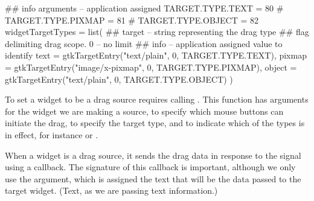 \begin{Schunk}
\begin{Sinput}
 ## info arguments -- application assigned
 TARGET.TYPE.TEXT   = 80                 # 
 TARGET.TYPE.PIXMAP = 81                 # 
 TARGET.TYPE.OBJECT = 82
 widgetTargetTypes = list(
 ## target -- string representing the drag type
 ## flag delimiting drag scope. 0 -- no limit
 ## info -- application assigned value to identify
 text = gtkTargetEntry("text/plain", 0, TARGET.TYPE.TEXT),
 pixmap = gtkTargetEntry("image/x-pixmap", 0, TARGET.TYPE.PIXMAP),
 object = gtkTargetEntry("text/plain", 0, TARGET.TYPE.OBJECT)
 )
\end{Sinput}
\end{Schunk}

To set a widget to be a drag source requires calling
. This function has arguments
 for the widget we are making a
source,   to specify
which mouse buttons can initiate the drag,
 to specify the target type, and
 to indicate which of the
 types is in effect, for instance  or
. 

When a widget is a drag source, it sends the drag data in response to
the  signal using a callback. The signature of
this callback is important, although we only use the 
argument, which is assigned the text that will be the data passed to
the target widget. (Text, as we are passing text information.)

\begin{Schunk}
\end{Schunk}

